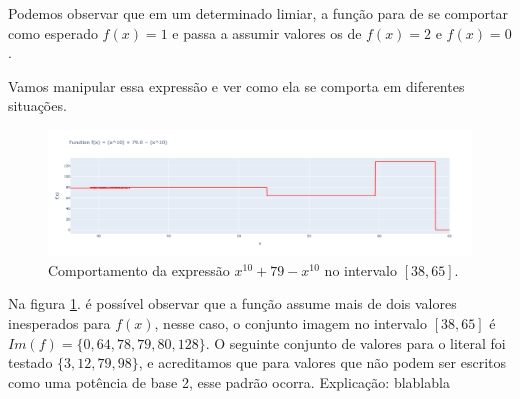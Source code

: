 Podemos observar que em um determinado limiar, a função para de se comportar como esperado $f(x) = 1$ e passa a assumir valores os de  $f(x) = 2$ e $f(x) = 0$.

Vamos manipular essa expressão e ver como ela se comporta em diferentes situações.

\begin{figure}[h]
    \centering 
    \includegraphics[width=1\textwidth]{Imagens/literal79.png}
    \caption{Comportamento da expressão \(x^{10} + 79 - x^{10}\) no intervalo \([38, 65]\).}
    \label{fig:literal79}
\end{figure}

Na figura  \ref{fig:literal79}. é possível observar que a função assume mais de dois valores inesperados para $f(x)$, nesse caso, o conjunto imagem no intervalo \([38, 65]\) é \( Im(f)  = \bigl\{ {0{,}64{,}78{,}79{,}80{,}128}\}\). 
O seguinte conjunto de valores para o literal foi testado \(\{3,12,79,98\}\), e acreditamos que para valores que não podem ser escritos como uma potência de base 2, esse padrão ocorra.
Explicação: blablabla


